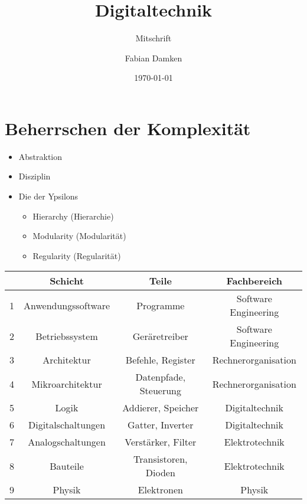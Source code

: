 \documentclass[12pt]{scrreprt}
\title{Digitaltechnik}
\subtitle{Mitschrift}
\author{Fabian Damken}
\date{\today}
\begin{document}
    \maketitle
    \tableofcontents

    \chapter{Beherrschen der Komplexität}
        \label{c:komplexitaet}

        \begin{itemize}
            \item Abstraktion
            \item Disziplin
            \item
                Die der Ypsilons
                \begin{itemize}
                    \item Hierarchy (Hierarchie)
                    \item Modularity (Modularität)
                    \item Regularity (Regularität)
                \end{itemize}
        \end{itemize}

        \begin{tabular}{c | c | c | c}
                & Schicht               & Teile                 & Fachbereich           \\
            \hline
            1   & Anwendungssoftware    & Programme             & Software Engineering  \\
            2   & Betriebssystem        & Geräretreiber         & Software Engineering  \\
            3   & Architektur           & Befehle, Register     & Rechnerorganisation   \\
            4   & Mikroarchitektur      & Datenpfade, Steuerung & Rechnerorganisation   \\
            5   & Logik                 & Addierer, Speicher    & Digitaltechnik        \\
            6   & Digitalschaltungen    & Gatter, Inverter      & Digitaltechnik        \\
            7   & Analogschaltungen     & Verstärker, Filter    & Elektrotechnik        \\
            8   & Bauteile              & Transistoren, Dioden  & Elektrotechnik        \\
            9   & Physik                & Elektronen            & Physik                \\
        \end{tabular}
\end{document}
